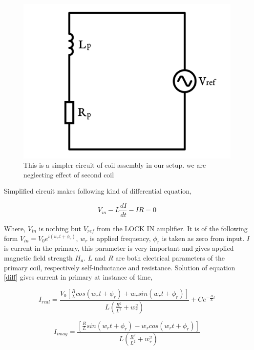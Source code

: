 \begin{figure}
  \includegraphics[width=1\linewidth]{circuit.png}
  \caption{This is a simpler circuit of coil assembly in our setup. we are neglecting effect of second coil}
  \label{fig:circuit}
\end{figure}

Simplified circuit makes following kind of differential equation,

\begin{equation}\label{diff}
  V_{in}-L\frac{dI}{dt}-IR=0
\end{equation}

Where, $V_{in}$ is nothing but $V_{ref}$ from the LOCK IN amplifier.  It is of the following form $V_{in} = V_0 e^{i(w_rt+\phi_r)}$, $w_r$ is applied frequency, $\phi_r$ is taken as zero from input. $I$ is current in the primary, this parameter is very important and gives applied magnetic field strength $H_a$. $L$ and $R$ are both electrical parameters of the primary coil, respectively self-inductance and resistance. Solution of equation \ref{diff} gives current in primary at instance of time,

\begin{equation}
I_{real} = \frac{V_0\left[\frac{R}{L} cos(w_rt+\phi_r)+w_r sin(w_rt+\phi_r)\right]}{L(\frac{R^2}{L^2}+w_r^2)}+Ce^{-\frac{R}{L}t}  
\end{equation}

\begin{equation}
I_{imag}=\frac{\left[\frac{R}{L} sin(w_rt+\phi_r)-w_r cos(w_rt+\phi_r)\right]}{L(\frac{R^2}{L^2}+w_r^2)}
\end{equation}

